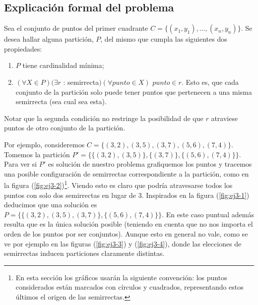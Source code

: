 \subsection{Explicación formal del problema}
\label{subsec:problema3}
Sea el conjunto de puntos del primer cuadrante $C = \{(x_1, y_1), \hdots, (x_n, y_n)\}$. Se desea hallar alguna partición, $P$, del mismo que cumpla las siguientes dos propiedades:
\begin{enumerate}
  \item $P$ tiene cardinalidad mínima;
  \item $(\forall X \in P) (\exists r$ : semirrecta$) (\forall punto \in X)$ $punto \in r$. Esto es, que cada conjunto de la partición solo puede tener puntos que pertenecen a una misma semirrecta (sea cual sea esta). 
\end{enumerate}
Notar que la segunda condición no restringe la posibilidad de que $r$ atraviese puntos de otro conjunto de la partición. 

Por ejemplo, consideremos $C=\{(3,2), (3,5), (3,7), (5,6), (7,4)\}$. Tomemos la partición $P' = \{\{(3,2), (3,5)\}, \{(3,7)\},\{(5,6), (7,4)\}\}$. Para ver si $P'$ es solución de nuestro problema grafiquemos los puntos y tracemos una posible configuración de semirrectas correspondiente a la partición, como en la figura (\ref{fig:ej3-2})\footnote{En esta sección los gráficos usarán la siguiente convención: los puntos considerados están marcados con círculos y cuadrados, representando estos últimos el origen de las semirrectas. }. Viendo esto es claro que podría atravesarse todos los puntos con solo dos semirrectas en lugar de 3. Inspirados en la figura (\ref{fig:ej3-1}) deducimos que una solución es $P = \{\{(3,2), (3,5), (3,7)\},\{(5,6), (7,4)\}\}$. En este caso puntual además resulta que es la única solución posible (teniendo en cuenta que no nos importa el orden de los puntos por ser conjuntos). Aunque esto en general no vale, como se ve por ejemplo en las figuras (\ref{fig:ej3-3}) y (\ref{fig:ej3-4}), donde las elecciones de semirrectas inducen particiones claramente distintas.

